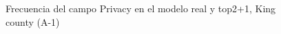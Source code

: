 \begin{figure}[H]
    \centering
    
    \caption{Frecuencia del campo Privacy en el modelo real y top2+1, King county (A-1)}
    \label{frecuency-top2+1-privacy}
\end{figure}